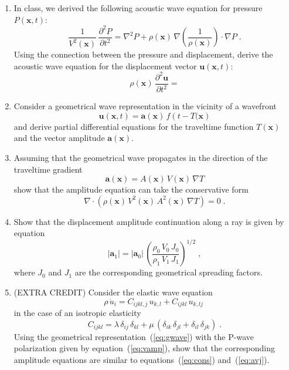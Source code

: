 \begin{enumerate}
\item In class, we derived the following acoustic wave equation for
  pressure $P(\mathbf{x},t)$:
\begin{equation}
{\frac{1}{V^2(\mathbf{x})}}\,{\frac{\partial^2 P}{\partial t^2}} =\nabla^2 P + 
\rho(\mathbf{x})\,
\nabla\left(\frac{1}{\rho(\mathbf{x})}\right) \cdot \nabla P\;.
\label{eq:pwave}
\end{equation}
Using the connection between the pressure and displacement, derive the
acoustic wave equation for the displacement vector
$\mathbf{u}(\mathbf{x},t)$:
\begin{equation}
  \label{eq:uwave}
  \rho(\mathbf{x})\,\frac{\partial^2 \mathbf{u}}{\partial t^2} =
\end{equation}
\item Consider a geometrical wave representation in the vicinity of a wavefront
\begin{equation}
  {\mathbf{u}(\mathbf{x},t)} = \mathbf{a}(\mathbf{x})\,f\left(t-T(\mathbf{x}\right)
  \label{eq:gwave}
\end{equation}
and derive partial differential equations for the traveltime function
$T(\mathbf{x})$ and the vector amplitude $\mathbf{a}(\mathbf{x})$.
\item Assuming that the geometrical wave propagates in the direction
  of the traveltime gradient
\begin{equation}
  {\mathbf{a}(\mathbf{x})} = A(\mathbf{x})\,V(\mathbf{x})\,\nabla T
  \label{eq:vamp}
\end{equation}
show that the amplitude equation can take the conservative form
\begin{equation}
  \label{eq:cons}
  \nabla \cdot \left(\rho(\mathbf{x})\,V^2(\mathbf{x})\,A^2(\mathbf{x})\,\nabla T\right) = 0\;.
\end{equation}
\item Show that the displacement amplitude continuation along a ray is given by equation 
\begin{equation}
  \label{eq:avj}
  \left|\mathbf{a}_1\right| = \left|\mathbf{a}_0\right|\,
  \left(\frac{\rho_0\,V_0\,J_0}{\rho_1\,V_1\,J_1}\right)^{1/2}\;, 
\end{equation}
where $J_0$ and $J_1$ are the corresponding geometrical spreading factors.
\item (EXTRA CREDIT) Consider the elastic wave equation
\begin{equation}
  \label{eq:ewave}
  \rho\,\ddot{u}_i = C_{ijkl,j}\,u_{k,l} + C_{ijkl}\,u_{k,lj}\;
\end{equation}
in the case of an isotropic elasticity
\begin{equation}
  \label{eq:lame}
  C_{ijkl} = \lambda\,\delta_{ij}\,\delta_{kl} + 
  \mu\,(\delta_{ik}\,\delta_{jl} + \delta_{il}\,\delta_{jk})\;.
\end{equation}
Using the geometrical representation~(\ref{eq:gwave}) with the P-wave
polarization given by equation~(\ref{eq:vamp}), show that the
corresponding amplitude equations are similar to
equations~(\ref{eq:cons}) and~(\ref{eq:avj}).
\end{enumerate}

